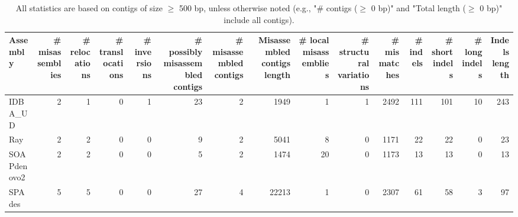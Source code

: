\documentclass[12pt,a4paper]{article}
\begin{document}
\begin{table}[ht]
\begin{center}
\caption{All statistics are based on contigs of size $\geq$ 500 bp, unless otherwise noted (e.g., "\# contigs ($\geq$ 0 bp)" and "Total length ($\geq$ 0 bp)" include all contigs).}
\begin{tabular}{|l*{14}{|r}|}
\hline
Assembly & \# misassemblies &     \# relocations &     \# translocations &     \# inversions & \# possibly misassembled contigs & \# misassembled contigs & Misassembled contigs length & \# local misassemblies & \# structural variations & \# mismatches & \# indels &     \# short indels &     \# long indels & Indels length \\ \hline
IDBA\_UD & 2 & 1 & 0 & 1 & 23 & 2 & 1949 & 1 & 1 & 2492 & 111 & 101 & 10 & 243 \\ \hline
Ray & 2 & 2 & 0 & 0 & 9 & 2 & 5041 & 8 & 0 & 1171 & 22 & 22 & 0 & 23 \\ \hline
SOAPdenovo2 & 2 & 2 & 0 & 0 & 5 & 2 & 1474 & 20 & 0 & 1173 & 13 & 13 & 0 & 13 \\ \hline
SPAdes & 5 & 5 & 0 & 0 & 27 & 4 & 22213 & 1 & 0 & 2307 & 61 & 58 & 3 & 97 \\ \hline
\end{tabular}
\end{center}
\end{table}
\end{document}
